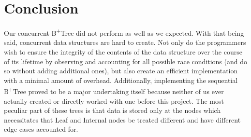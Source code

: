 \documentclass[conference]{IEEEtran}
\begin{document}
%





\section{Conclusion}
Our concurrent B\textsuperscript{+}Tree did not perform as well as we expected.
With that being said, concurrent data structures are hard to create. Not only
do the programmers wish to ensure the integrity of the contents of the data 
structure over the course of its lifetime by observing and accounting for all
possible race conditions (and do so without adding additional ones), but also
create an efficient implementation with a minimal amount of overhead.
    Additionally, implementing the sequential B\textsuperscript{+}Tree proved
to be a major undertaking itself because neither of us ever actually created
or directly worked with one before this project. The most peculiar part of
these trees is that data is stored only at the nodes which necessitates that
Leaf and Internal nodes be treated different and have different edge-cases
accounted for.
\end{document}
